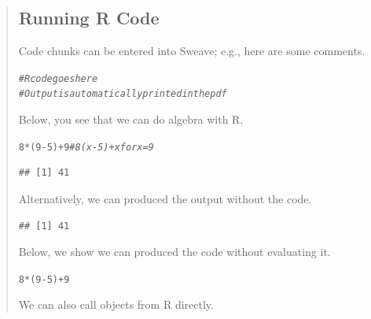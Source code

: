 \documentclass{article}\usepackage[]{graphicx}\usepackage[]{xcolor}
\makeatletter
\newcommand{\hlnum}[1]{\textcolor[rgb]{0.686,0.059,0.569}{#1}}%
\newcommand{\hlcom}[1]{\textcolor[rgb]{0.678,0.584,0.686}{\textit{#1}}}%
\newcommand{\hlopt}[1]{\textcolor[rgb]{0,0,0}{#1}}%
\newcommand{\hldef}[1]{\textcolor[rgb]{0.345,0.345,0.345}{#1}}%
\newenvironment{kframe}{%
 \def\at@end@of@kframe{}%
 \ifinner\ifhmode%
  \def\at@end@of@kframe{\end{minipage}}%
  \begin{minipage}{\columnwidth}%
 \fi\fi%
 \def\FrameCommand##1{\hskip\@totalleftmargin \hskip-\fboxsep
 \colorbox{shadecolor}{##1}\hskip-\fboxsep
     \hskip-\linewidth \hskip-\@totalleftmargin \hskip\columnwidth}%
 \MakeFramed {\advance\hsize-\width
   \@totalleftmargin\z@ \linewidth\hsize
   \@setminipage}}%
 {\par\unskip\endMakeFramed%
 \at@end@of@kframe}
\newenvironment{knitrout}{}{} %
\makeatother
\begin{document}
\begin{multicols}{2}
\begin{quote}
\subsection{Running R Code}
\noindent Code chunks can be entered into Sweave; e.g., here are some comments.
\begin{knitrout}\scriptsize
{}\color{fgcolor}\begin{kframe}
\begin{alltt}
\hlcom{# R code goes here}
\hlcom{# Output is automatically printed in the pdf}
\end{alltt}
\end{kframe}
\end{knitrout}
Below, you see that we can do algebra with R.
\begin{knitrout}\scriptsize
{}\color{fgcolor}\begin{kframe}
\begin{alltt}
\hlnum{8}\hlopt{*}\hldef{(}\hlnum{9}\hlopt{-}\hlnum{5}\hldef{)} \hlopt{+} \hlnum{9} \hlcom{# 8(x-5) + x for x=9}
\end{alltt}
\begin{verbatim}
## [1] 41
\end{verbatim}
\end{kframe}
\end{knitrout}
Alternatively, we can produced the output without the code.
\begin{knitrout}\scriptsize
{}\color{fgcolor}\begin{kframe}
\begin{verbatim}
## [1] 41
\end{verbatim}
\end{kframe}
\end{knitrout}
Below, we show we can produced the code without evaluating it.
\begin{knitrout}\scriptsize
{}\color{fgcolor}\begin{kframe}
\begin{alltt}
\hlnum{8}\hlopt{*}\hldef{(}\hlnum{9}\hlopt{-}\hlnum{5}\hldef{)} \hlopt{+} \hlnum{9}
\end{alltt}
\end{kframe}
\end{knitrout}
We can also call objects from R directly.
\begin{knitrout}\scriptsize
{}\color{fgcolor}\begin{kframe}

\end{kframe}
\end{knitrout}
\end{quote}
\end{multicols}
\end{document}
